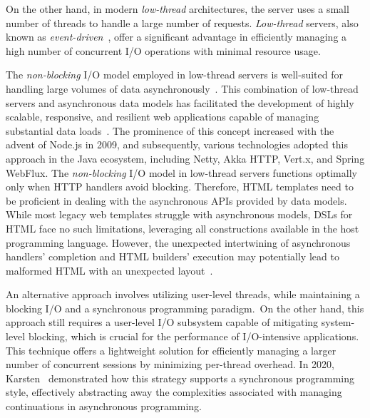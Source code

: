 \documentclass[software,article,accept,pdftex,moreauthors]{Definitions/mdpi}
\begin{document}
On the other hand, in modern \textit{low-thread} architectures, the server uses
a small number of threads to handle a large number of requests.
\textit{Low-thread} servers, also known as
\textit{event-driven}~\cite{event-driven-servers}, offer a significant
advantage in efficiently managing a high number of concurrent I/O operations
with minimal resource usage.

The \textit{non-blocking} I/O model employed in low-thread servers is
well-suited for handling large volumes of data asynchronously~\cite{Meijer12}.
This combination of low-thread servers and asynchronous data models has
facilitated the development of highly scalable, responsive, and resilient web
applications capable of managing substantial data loads~\cite{Jin15}. The
prominence of this concept increased with the advent of Node.js in 2009, and
subsequently, various technologies adopted this approach in the Java ecosystem,
including Netty, Akka HTTP, Vert.x, and Spring WebFlux.
The \textit{non-blocking} I/O model in low-thread servers functions optimally
only when HTTP handlers avoid blocking. Therefore, HTML templates need to be
proficient in dealing with the asynchronous APIs provided by data models. While
most legacy web templates struggle with asynchronous models, DSLs for HTML face
no such limitations, leveraging all constructions available in the host
programming language. However, the unexpected intertwining of asynchronous
handlers' completion and HTML builders' execution may potentially lead to
malformed HTML with an unexpected layout~\cite{wise2024pssr}.

An alternative approach involves utilizing user-level threads, while
maintaining a blocking I/O and a synchronous programming paradigm.~On the other hand,
this approach still requires a user-level I/O subsystem capable of mitigating
system-level blocking, which is crucial for the performance of I/O-intensive
applications. This technique offers a lightweight solution for efficiently
managing a larger number of concurrent sessions by minimizing per-thread
overhead. In 2020, Karsten~\cite{karsten2020} demonstrated how this strategy
supports a synchronous programming style, effectively abstracting away the
complexities associated with managing continuations in asynchronous
programming.
\end{document}
